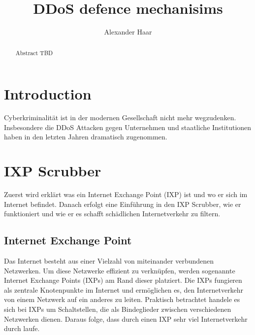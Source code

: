 \documentclass[sigplan,screen]{acmart}
\begin{document}
\title{DDoS defence mechanisims }

\author{Alexander Haar}

\begin{abstract}
  Abstract TBD
\end{abstract}



\maketitle

\section{Introduction}
Cyberkriminalität ist in der modernen Gesellschaft nicht mehr wegzudenken. Insbesondere die DDoS Attacken gegen Unternehmen und staatliche Institutionen haben in den letzten Jahren dramatisch zugenommen.

\section{IXP Scrubber}
Zuerst wird erklärt was ein Internet Exchange Point (IXP) ist und wo er sich im Internet befindet. Danach erfolgt eine Einführung in den IXP Scrubber, wie er funktioniert und wie er es schafft schädlichen Internetverkehr zu filtern.

\subsection{Internet Exchange Point}
Das Internet besteht aus einer Vielzahl von miteinander verbundenen Netzwerken. Um diese Netzwerke effizient zu verknüpfen, werden sogenannte Internet Exchange Points (IXPs) am Rand dieser platziert. Die IXPs fungieren als zentrale Knotenpunkte im Internet und ermöglichen es, den Internetverkehr von einem Netzwerk auf ein anderes zu leiten. Praktisch betrachtet handele es sich bei IXPs um Schaltstellen, die als Bindeglieder zwischen verschiedenen Netzwerken dienen. Daraus folge, dass durch einen IXP sehr viel Internetverkehr durch laufe.
\end{document}

